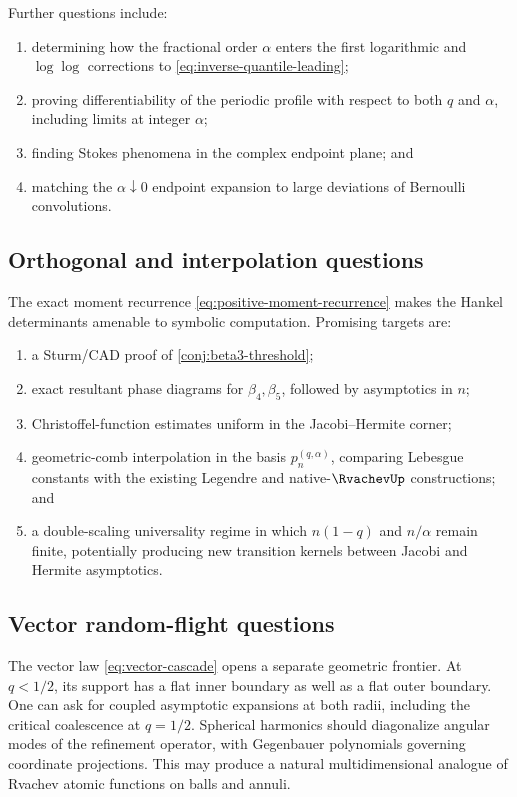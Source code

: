 \documentclass[11pt]{article}
\theoremstyle{definition}
\theoremstyle{remark}
\begin{document}
Further questions include:
\begin{enumerate}[label=(\alph*)]
 \item determining how the fractional order \(\alpha\) enters the first
       logarithmic and \(\log\log\) corrections to
       \eqref{eq:inverse-quantile-leading};
 \item proving differentiability of the periodic profile with respect to both
       \(q\) and \(\alpha\), including limits at integer \(\alpha\);
 \item finding Stokes phenomena in the complex endpoint plane; and
 \item matching the \(\alpha\downarrow0\) endpoint expansion to large
       deviations of Bernoulli convolutions.
\end{enumerate}

\subsection{Orthogonal and interpolation questions}

The exact moment recurrence \eqref{eq:positive-moment-recurrence} makes the
Hankel determinants amenable to symbolic computation.  Promising targets are:
\begin{enumerate}[label=(\alph*)]
 \item a Sturm/CAD proof of \cref{conj:beta3-threshold};
 \item exact resultant phase diagrams for \(\beta_4,\beta_5\), followed by
       asymptotics in \(n\);
 \item Christoffel-function estimates uniform in the Jacobi--Hermite corner;
 \item geometric-comb interpolation in the basis
       \(p_n^{(q,\alpha)}\), comparing Lebesgue constants with the existing
       Legendre and native-\(\RvachevUp\) constructions; and
 \item a double-scaling universality regime in which
       \(n(1-q)\) and \(n/\alpha\) remain finite, potentially producing new
       transition kernels between Jacobi and Hermite asymptotics.
\end{enumerate}

\subsection{Vector random-flight questions}

The vector law \eqref{eq:vector-cascade} opens a separate geometric frontier.
At \(q<1/2\), its support has a flat inner boundary as well as a flat outer
boundary.  One can ask for coupled asymptotic expansions at both radii,
including the critical coalescence at \(q=1/2\).  Spherical harmonics should
diagonalize angular modes of the refinement operator, with Gegenbauer
polynomials governing coordinate projections.  This may produce a natural
multidimensional analogue of Rvachev atomic functions on balls and annuli.
\end{document}
